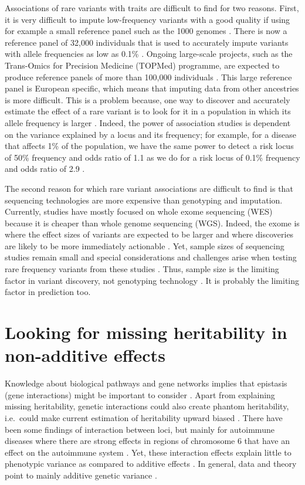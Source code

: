 Associations of rare variants with traits are difficult to find for two reasons. 
First, it is very difficult to impute low-frequency variants with a good quality if using for example a small reference panel such as the 1000 genomes \cite[]{nikpay2015comprehensive}. There is now a reference panel of 32,000 individuals that is used to accurately impute variants with allele frequencies as low as 0.1\% \cite[]{mccarthy2016reference}. Ongoing large-scale projects, such as the Trans-Omics for Precision Medicine (TOPMed) programme, are expected to produce reference panels 
of more than 100,000 individuals \cite[]{taliun2019sequencing}.
This large reference panel is European specific, which means that imputing data from other ancestries is more difficult. This is a problem because, one way to discover and accurately estimate the effect of a rare variant is to look for it in a population in which its allele frequency is larger \cite[]{moltke2014common,minster2016thrifty}. 
Indeed, the power of association studies is dependent on the variance explained by a locus and its frequency; for example, for a disease that affects 1\% of the population, we have the same power to detect a risk locus of 50\% frequency and odds ratio of 1.1 as we do for a risk locus of 0.1\% frequency and odds ratio of 2.9 \cite[]{wray2018common}.

The second reason for which rare variant associations are difficult to find is that sequencing technologies are more expensive than genotyping and imputation. Currently, studies have mostly focused on whole exome sequencing (WES) because it is cheaper than whole genome sequencing (WGS). 
Indeed, the exome is where the effect sizes of variants are expected to be larger and where discoveries are likely to be more immediately actionable \cite[]{zuk2014searching}. 
Yet, sample sizes of sequencing studies remain small and special considerations and challenges arise when testing rare frequency variants from these studies \cite[]{auer2015rare}.
Thus, sample size is the limiting factor in variant discovery, not genotyping technology \cite[]{wray2018common}. 
It is probably the limiting factor in prediction too.

\section{Looking for missing heritability in non-additive effects}

Knowledge about biological pathways and gene networks implies that epistasis (gene interactions) might be important to consider \cite[]{hill2008data}. 
Apart from explaining missing heritability, genetic interactions could also create phantom heritability, i.e.\ could make current estimation of heritability upward biased \cite[]{zuk2012mystery}.
There have been some findings of interaction between loci, but mainly for autoimmune diseases where there are strong effects in regions of chromosome 6 that have an effect on the autoimmune system \cite[]{lenz2015widespread,goudey2017interactions}.
Yet, these interaction effects explain little to phenotypic variance as compared to additive effects \cite[]{lenz2015widespread}.
In general, data and theory point to mainly additive genetic variance \cite[]{hill2008data}.

